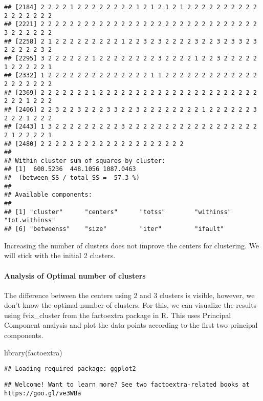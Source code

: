 \documentclass[
]{article}
\newenvironment{Shaded}{\begin{snugshade}}{\end{snugshade}}
\newcommand{\FunctionTok}[1]{\textcolor[rgb]{0.00,0.00,0.00}{#1}}
\newcommand{\NormalTok}[1]{#1}
\begin{document}
\begin{verbatim}
## [2184] 2 2 2 2 1 2 2 2 2 2 2 2 2 1 2 1 2 1 2 1 2 2 2 2 2 2 2 2 2 2 2 2 2 2 2 2 2
## [2221] 2 2 2 2 2 2 2 2 2 2 2 2 2 2 2 2 2 2 2 2 2 2 2 2 2 2 2 2 2 2 3 2 2 2 2 2 2
## [2258] 2 1 2 2 2 2 2 2 2 2 2 1 2 2 3 2 3 2 2 2 2 3 2 2 3 2 3 3 2 3 2 2 2 2 2 3 2
## [2295] 3 2 2 2 2 2 2 1 2 2 2 2 2 2 2 2 3 2 2 2 2 1 2 2 3 2 2 2 2 2 1 2 2 2 2 2 1
## [2332] 1 2 2 2 2 2 2 2 2 2 2 2 2 2 2 1 1 2 2 2 2 2 2 2 2 2 2 2 2 2 2 2 2 2 2 2 2
## [2369] 2 2 2 2 2 2 2 1 2 2 2 2 2 2 2 2 2 2 2 2 2 2 2 2 2 2 2 2 2 2 2 2 2 1 2 2 2
## [2406] 2 2 3 2 2 3 2 2 2 3 3 2 2 3 2 2 2 2 2 2 2 2 1 2 2 2 2 2 2 3 2 2 2 1 2 2 2
## [2443] 1 3 2 2 2 2 2 2 2 2 2 3 2 2 2 2 2 2 2 2 2 2 2 2 2 2 2 2 2 2 2 1 2 2 2 2 1
## [2480] 2 2 2 2 2 2 2 2 2 2 2 2 2 2 2 2 2 2 2 2
## 
## Within cluster sum of squares by cluster:
## [1]  600.5236  448.1056 1087.0463
##  (between_SS / total_SS =  57.3 %)
## 
## Available components:
## 
## [1] "cluster"      "centers"      "totss"        "withinss"     "tot.withinss"
## [6] "betweenss"    "size"         "iter"         "ifault"
\end{verbatim}

Increasing the number of clusters does not improve the centers for
clustering. We will stick with the initial 2 clusters.

\hypertarget{analysis-of-optimal-number-of-clusters}{%
\paragraph{Analysis of Optimal number of
clusters}\label{analysis-of-optimal-number-of-clusters}}

The difference between the centers using 2 and 3 clusters is visible,
however, we don't know the optimal number of clusters. For this, we can
visualize the results using fviz\_cluster from the factoextra package in
R. This uses Principal Component analysis and plot the data points
according to the first two principal components.

\begin{Shaded}
\begin{Highlighting}[]
\FunctionTok{library}\NormalTok{(factoextra)}
\end{Highlighting}
\end{Shaded}

\begin{verbatim}
## Loading required package: ggplot2
\end{verbatim}

\begin{verbatim}
## Welcome! Want to learn more? See two factoextra-related books at https://goo.gl/ve3WBa
\end{verbatim}
\end{document}
